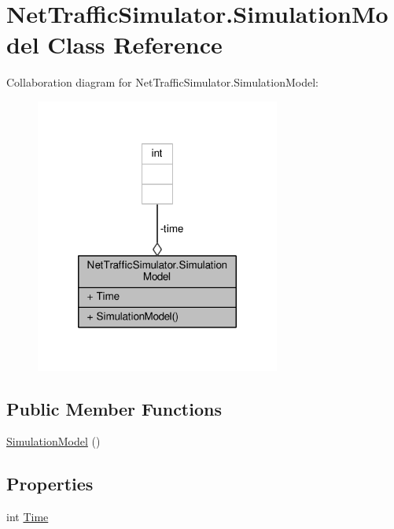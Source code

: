 \hypertarget{classNetTrafficSimulator_1_1SimulationModel}{\section{Net\-Traffic\-Simulator.\-Simulation\-Model Class Reference}
\label{classNetTrafficSimulator_1_1SimulationModel}
}


Collaboration diagram for Net\-Traffic\-Simulator.\-Simulation\-Model\-:\nopagebreak
\begin{figure}[H]
\begin{center}
\leavevmode
\includegraphics[width=228pt]{classNetTrafficSimulator_1_1SimulationModel__coll__graph}
\end{center}
\end{figure}
\subsection*{Public Member Functions}
\begin{DoxyCompactItemize}
\item 
\hyperlink{classNetTrafficSimulator_1_1SimulationModel_a51c142016b62eca2ff2dac127e415428}{Simulation\-Model} ()
\end{DoxyCompactItemize}
\subsection*{Properties}
\begin{DoxyCompactItemize}
\item 
int \hyperlink{classNetTrafficSimulator_1_1SimulationModel_af6282b8090707c19463e3ca9da347691}{Time}
\end{DoxyCompactItemize}
